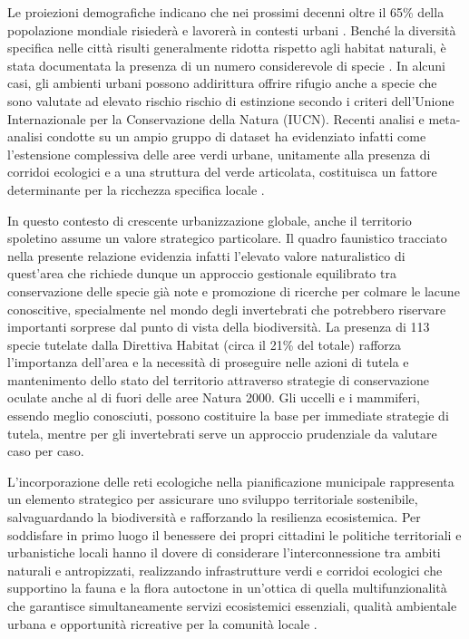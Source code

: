 \documentclass[
  a4paper,
]{book}
\begin{document}
Le proiezioni demografiche indicano che nei prossimi decenni oltre il 65\% della popolazione mondiale risiederà e lavorerà in contesti urbani \citep{owid-population-growth}. Benché la diversità specifica nelle città risulti generalmente ridotta rispetto agli habitat naturali, è stata documentata la presenza di un numero considerevole di specie \citep{heinoUnravellingCorrelatesSpecies2017, weisserAnimalaidedDesignPlanning2025, fairbairnUrbanBiodiversityAffected2024, visintinDesigningCitiesEveryday2025, mendezBetterNotMore2024}. In alcuni casi, gli ambienti urbani possono addirittura offrire rifugio anche a specie che sono valutate ad elevato rischio rischio di estinzione secondo i criteri dell'Unione Internazionale per la Conservazione della Natura (IUCN). Recenti analisi e meta-analisi condotte su un ampio gruppo di dataset ha evidenziato infatti come l'estensione complessiva delle aree verdi urbane, unitamente alla presenza di corridoi ecologici e a una struttura del verde articolata, costituisca un fattore determinante per la ricchezza specifica locale \citep{aronson2017, beninde2015biodiversity, gill2007adapting, tzoulas2007promoting}.

In questo contesto di crescente urbanizzazione globale, anche il territorio spoletino assume un valore strategico particolare. Il quadro faunistico tracciato nella presente relazione evidenzia infatti l'elevato valore naturalistico di quest'area che richiede dunque un approccio gestionale equilibrato tra conservazione delle specie già note e promozione di ricerche per colmare le lacune conoscitive, specialmente nel mondo degli invertebrati che potrebbero riservare importanti sorprese dal punto di vista della biodiversità. La presenza di 113 specie tutelate dalla Direttiva Habitat (circa il 21\% del totale) rafforza l'importanza dell'area e la necessità di proseguire nelle azioni di tutela e mantenimento dello stato del territorio attraverso strategie di conservazione oculate anche al di fuori delle aree Natura 2000. Gli uccelli e i mammiferi, essendo meglio conosciuti, possono costituire la base per immediate strategie di tutela, mentre per gli invertebrati serve un approccio prudenziale da valutare caso per caso.

L'incorporazione delle reti ecologiche nella pianificazione municipale rappresenta un elemento strategico per assicurare uno sviluppo territoriale sostenibile, salvaguardando la biodiversità e rafforzando la resilienza ecosistemica. Per soddisfare in primo luogo il benessere dei propri cittadini le politiche territoriali e urbanistiche locali hanno il dovere di considerare l'interconnessione tra ambiti naturali e antropizzati, realizzando infrastrutture verdi e corridoi ecologici che supportino la fauna e la flora autoctone in un'ottica di quella multifunzionalità che garantisce simultaneamente servizi ecosistemici essenziali, qualità ambientale urbana e opportunità ricreative per la comunità locale \citep{fairbairnUrbanBiodiversityAffected2024}.
\end{document}
